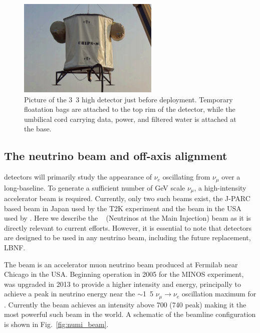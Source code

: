 \begin{figure} %
    \includegraphics[width=0.6\textwidth]{diagrams/4-chips/chips_m.png}
    \caption[Picture of the \chipsm detector.]
    {Picture of the \unit{3.3}{} high \chipsm detector just before deployment. Temporary
        floatation bags are attached to the top rim of the detector, while the umbilical cord
        carrying data, power, and filtered water is attached at the base.}
    \label{fig:chips_m}
\end{figure}

\subsection{The neutrino beam and off-axis alignment} %
\label{sec:chips_concept_beam} %

\chips detectors will primarily study the appearance of $\nu_{e}$ oscillating from $\nu_{\mu}$
over a long-baseline. To generate a sufficient number of GeV scale $\nu_{\mu}$, a high-intensity
accelerator beam is required. Currently, only two such beams exist, the J-PARC based beam in Japan
used by the T2K experiment and the \numi beam in the USA used by \nova. Here we describe the
\numi~\cite{adamson2016} (Neutrinos at the Main Injection) beam as it is directly relevant to
current \chips efforts. However, it is essential to note that \chips detectors are designed to be
used in any neutrino beam, including the future \numi replacement, LBNF.

The \numi beam is an accelerator muon neutrino beam produced at Fermilab near Chicago in the USA.
Beginning operation in 2005 for the MINOS experiment, \numi was upgraded in 2013 to provide a
higher intensity and energy, principally to achieve a peak in neutrino energy near the
$\sim$\unit{1.5}{\GeV} $\nu_{\mu}\rightarrow\nu_{e}$ oscillation maximum for \nova. Currently the
\numi beam achieves an intensity above \unit{700}{} (\unit{740}{} peak)
making it the most powerful such beam in the world. A schematic of the \numi beamline
configuration is shown in Fig.~\ref{fig:numi_beam}.

